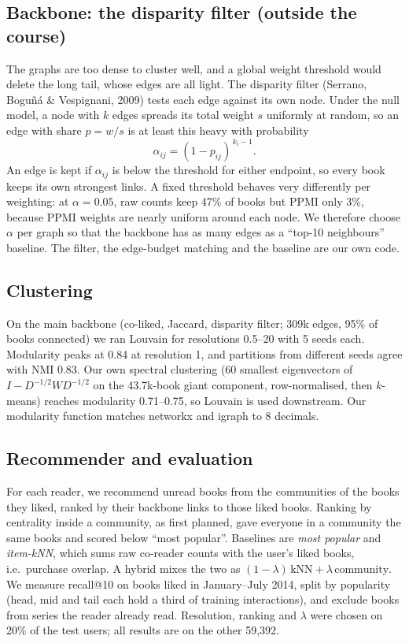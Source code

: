 \subsection{Backbone: the disparity filter (outside the course)}
The graphs are too dense to cluster well, and a global weight threshold would
delete the long tail, whose edges are all light. The disparity filter
(Serrano, Bogu\~n\'a \& Vespignani, 2009) tests each edge against its own node.
Under the null model, a node with $k$ edges spreads its total weight $s$
uniformly at random, so an edge with share $p = w/s$ is at least this heavy with
probability
\begin{equation}
  \alpha_{ij} = (1 - p_{ij})^{\,k_i - 1}.
\end{equation}
An edge is kept if $\alpha_{ij}$ is below the threshold for either endpoint, so
every book keeps its own strongest links. A fixed threshold behaves very
differently per weighting: at $\alpha = 0.05$, raw counts keep 47\% of books but
PPMI only 3\%, because PPMI weights are nearly uniform around each node. We
therefore choose $\alpha$ per graph so that the backbone has as many edges as a
``top-10 neighbours'' baseline. The filter, the edge-budget matching and the
baseline are our own code.

\subsection{Clustering}
On the main backbone (co-liked, Jaccard, disparity filter; 309k edges, 95\% of
books connected) we ran Louvain for resolutions 0.5--20 with 5 seeds each.
Modularity peaks at 0.84 at resolution 1, and partitions from different seeds
agree with NMI 0.83. Our own spectral clustering (60 smallest eigenvectors of
$I - D^{-1/2} W D^{-1/2}$ on the 43.7k-book giant component, row-normalised,
then $k$-means) reaches modularity 0.71--0.75, so Louvain is used downstream.
Our modularity function matches networkx and igraph to 8 decimals.

\subsection{Recommender and evaluation}
For each reader, we recommend unread books from the communities of the books
they liked, ranked by their backbone links to those liked books. Ranking by
centrality inside a community, as first planned, gave everyone in a community
the same books and scored below ``most popular''. Baselines are \emph{most
popular} and \emph{item-kNN}, which sums raw co-reader counts with the user's
liked books, i.e.\ purchase overlap. A hybrid mixes the two as
$(1-\lambda)\,\text{kNN} + \lambda\,\text{community}$.
We measure recall@10 on books liked in January--July 2014, split by popularity
(head, mid and tail each hold a third of training interactions), and exclude
books from series the reader already read. Resolution, ranking and $\lambda$ were
chosen on 20\% of the test users; all results are on the other 59,392.

